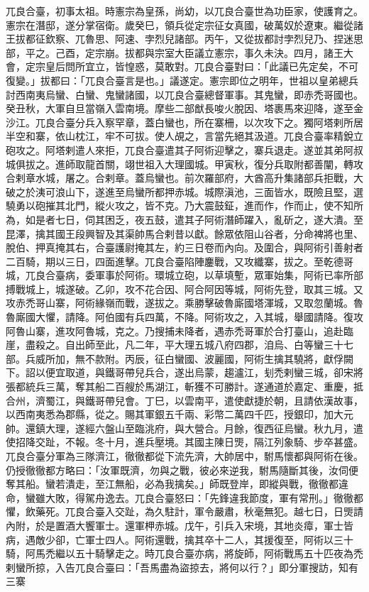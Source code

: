 \begin{pinyinscope}
 兀良合臺，初事太祖。時憲宗為皇孫，尚幼，以兀良合臺世為功臣家，使護育之。憲宗在潛邸，遂分掌宿衛。歲癸巳，領兵從定宗征女真國，破萬奴於遼東。繼從諸王拔都征欽察、兀魯思、阿速、孛烈兒諸部。丙午，又從拔都討孛烈兒乃、捏迷思部，平之。己酉，定宗崩。拔都與宗室大臣議立憲宗，事久未決。四月，諸王大會，定宗皇后問所宜立，皆惶惑，莫敢對。兀良合臺對曰：「此議已先定矣，不可復變。」拔都曰：「兀良合臺言是也。」議遂定。憲宗即位之明年，世祖以皇弟總兵討西南夷烏蠻、白蠻、鬼蠻諸國，以兀良合臺總督軍事。其鬼蠻，即赤禿哥國也。癸丑秋，大軍自旦當嶺入雲南境。摩些二部猷長唆火脫因、塔裹馬來迎降，遂至金沙江。兀良合臺分兵入察罕章，蓋白蠻也，所在寨柵，以次攻下之。獨阿塔剌所居半空和寨，依山枕江，牢不可拔。使人覘之，言當先絕其汲道。兀良合臺率精銳立砲攻之。阿塔剌遣人來拒，兀良合臺遣其子阿術迎擊之，寨兵退走。遂並其弟阿叔城俱拔之。進師取龍首關，翊世祖入大理國城。甲寅秋，復分兵取附都善闡，轉攻合剌章水城，屠之。合剌章。蓋烏蠻也。前次羅部府，大酋高升集諸部兵拒戰，大破之於洟可浪山下，遂進至烏蠻所都押赤城。城際滇池，三面皆水，既險且堅，選驍勇以砲摧其北門，縱火攻之，皆不克。乃大震鼓鉦，進而作，作而止，使不知所為，如是者七日，伺其困乏，夜五鼓，遣其子阿術潛師躍入，亂斫之，遂大潰。至昆澤，擒其國王段興智及其渠帥馬合剌昔以獻。餘眾依阻山谷者，分命裨將也里、脫伯、押真掩其右，合臺護尉掩其左，約三日卷而內向。及圍合，與阿術引善射者二百騎，期以三日，四面進擊。兀良合臺陷陣鏖戰，又攻纖寨，拔之。至乾德哥城，兀良合臺病，委軍事於阿術。環城立砲，以草填塹，眾軍始集，阿術已率所部搏戰城上，城遂破。乙卯，攻不花合因、阿合阿因等城，阿術先登，取其三城。又攻赤禿哥山寨，阿術緣嶺而戰，遂拔之。乘勝擊破魯廝國塔渾城，又取忽蘭城。魯魯廝國大懼，請降。阿伯國有兵四萬，不降。阿術攻之，入其城，舉國請降。復攻阿魯山寨，進攻阿魯城，克之。乃搜捕未降者，遇赤禿哥軍於合打臺山，追赴臨崖，盡殺之。自出師至此，凡二年，平大理五城八府四郡，洎烏、白等蠻三十七部。兵威所加，無不款附。丙辰，征白蠻國、波麗國，阿術生擒其驍將，獻俘闕下。詔以便宜取道，與鐵哥帶兒兵合，遂出烏蒙，趨瀘江，刬禿剌蠻三城，卻宋將張都統兵三萬，奪其船二百艘於馬湖江，斬獲不可勝計。遂通道於嘉定、重慶，抵合州，濟蜀江，與鐵哥帶兒會。丁巳，以雲南平，遣使獻捷於朝，且請依漢故事，以西南夷悉為郡縣，從之。賜其軍銀五千兩、彩幣二萬四千匹，授銀印，加大元帥。還鎮大理，遂經六盤山至臨洮府，與大營合。月餘，復西征烏蠻。秋九月，遣使招降交趾，不報。冬十月，進兵壓境。其國主陳日煚，隔江列象騎、步卒甚盛。兀良合臺分軍為三隊濟江，徹徹都從下流先濟，大帥居中，駙馬懷都與阿術在後。仍授徹徹都方略曰：「汝軍既濟，勿與之戰，彼必來逆我，駙馬隨斷其後，汝伺便奪其船。蠻若潰走，至江無船，必為我擒矣。」師既登岸，即縱與戰，徹徹都違命，蠻雖大敗，得駕舟逸去。兀良合臺怒曰：「先鋒違我節度，軍有常刑。」徹徹都懼，飲藥死。兀良合臺入交趾，為久駐計，軍令嚴肅，秋毫無犯。越七日，日煚請內附，於是置酒大饗軍士。還軍柙赤城。戊午，引兵入宋境，其地炎瘴，軍士皆病，遇敵少卻，亡軍士四人。阿術還戰，擒其卒十二人，其援復至，阿術以三十騎，阿馬禿繼以五十騎擊走之。時兀良合臺亦病，將旋師，阿術戰馬五十匹夜為禿剌蠻所掠，入告兀良合臺曰：「吾馬盡為盜掠去，將何以行？」即分軍搜訪，知有三寨
\end{pinyinscope}
